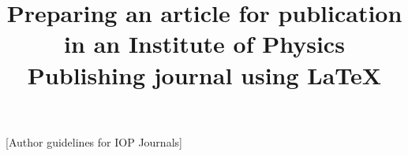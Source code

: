 \def\cqo#1#2{\cos[q\Omega^{\rm #1}_S(b_f,R^s_{#2})]}
%

\title{Preparing an article for publication in an Institute of Physics
Publishing journal using \LaTeX}[Author guidelines for IOP Journals]


